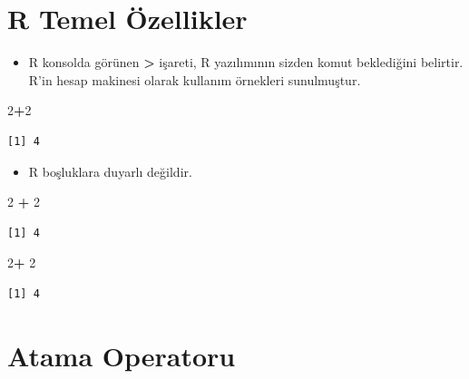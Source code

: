\documentclass[
  oneside]{book}
\newenvironment{Shaded}{\begin{snugshade}}{\end{snugshade}}
\newcommand{\DecValTok}[1]{\textcolor[rgb]{0.00,0.00,0.81}{#1}}
\newcommand{\SpecialCharTok}[1]{\textcolor[rgb]{0.81,0.36,0.00}{\textbf{#1}}}
\providecommand{\tightlist}{%
  \setlength{\itemsep}{0pt}\setlength{\parskip}{0pt}}
\begin{document}
\hypertarget{r-temel-uxf6zellikler}{%
\section{R Temel Özellikler}\label{r-temel-uxf6zellikler}}

\begin{itemize}
\tightlist
\item
  R konsolda görünen \textbf{\textgreater{}} işareti, R yazılımının sizden komut beklediğini belirtir. R'in hesap makinesi olarak kullanım örnekleri sunulmuştur.
\end{itemize}

\begin{Shaded}
\begin{Highlighting}[]
\DecValTok{2}\SpecialCharTok{+}\DecValTok{2}
\end{Highlighting}
\end{Shaded}

\begin{verbatim}
[1] 4
\end{verbatim}

\begin{itemize}
\tightlist
\item
  R boşluklara duyarlı değildir.
\end{itemize}

\begin{Shaded}
\begin{Highlighting}[]
\DecValTok{2}  \SpecialCharTok{+}       \DecValTok{2} 
\end{Highlighting}
\end{Shaded}

\begin{verbatim}
[1] 4
\end{verbatim}

\begin{Shaded}
\begin{Highlighting}[]
\DecValTok{2}\SpecialCharTok{+}
  \DecValTok{2}
\end{Highlighting}
\end{Shaded}

\begin{verbatim}
[1] 4
\end{verbatim}

\hypertarget{atama-operatoru}{%
\section{Atama Operatoru}\label{atama-operatoru}}
\end{document}
